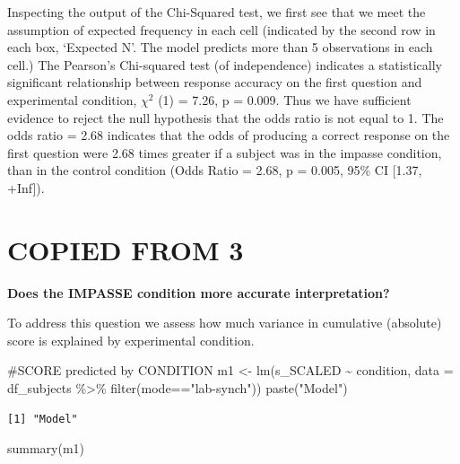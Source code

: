 \documentclass[
  letterpaper,
  DIV=11,
  numbers=noendperiod]{scrreprt}
\newenvironment{Shaded}{\begin{snugshade}}{\end{snugshade}}
\newcommand{\AttributeTok}[1]{\textcolor[rgb]{0.40,0.45,0.13}{#1}}
\newcommand{\CommentTok}[1]{\textcolor[rgb]{0.37,0.37,0.37}{#1}}
\newcommand{\FunctionTok}[1]{\textcolor[rgb]{0.28,0.35,0.67}{#1}}
\newcommand{\NormalTok}[1]{\textcolor[rgb]{0.00,0.23,0.31}{#1}}
\newcommand{\OtherTok}[1]{\textcolor[rgb]{0.00,0.23,0.31}{#1}}
\newcommand{\SpecialCharTok}[1]{\textcolor[rgb]{0.37,0.37,0.37}{#1}}
\newcommand{\StringTok}[1]{\textcolor[rgb]{0.13,0.47,0.30}{#1}}
\begin{document}
Inspecting the output of the Chi-Squared test, we first see that we meet
the assumption of expected frequency in each cell (indicated by the
second row in each box, `Expected N'. The model predicts more than 5
observations in each cell.) The Pearson's Chi-squared test (of
independence) indicates a statistically significant relationship between
response accuracy on the first question and experimental condition,
\(\chi^2\) (1) = 7.26, p = 0.009. Thus we have sufficient evidence to
reject the null hypothesis that the odds ratio is not equal to 1. The
odds ratio = 2.68 indicates that the odds of producing a correct
response on the first question were 2.68 times greater if a subject was
in the impasse condition, than in the control condition (Odds Ratio =
2.68, p = 0.005, 95\% CI {[}1.37, +Inf{]}).

\hypertarget{copied-from-3}{%
\section{COPIED FROM 3}\label{copied-from-3}}

\textbf{Does the IMPASSE condition more accurate interpretation?}

To address this question we assess how much variance in cumulative
(absolute) score is explained by experimental condition.

\begin{Shaded}
\begin{Highlighting}[]
\CommentTok{\#SCORE predicted by CONDITION}
\NormalTok{m1 }\OtherTok{\textless{}{-}} \FunctionTok{lm}\NormalTok{(s\_SCALED }\SpecialCharTok{\textasciitilde{}}\NormalTok{ condition, }\AttributeTok{data =}\NormalTok{ df\_subjects }\SpecialCharTok{\%\textgreater{}\%} \FunctionTok{filter}\NormalTok{(mode}\SpecialCharTok{==}\StringTok{"lab{-}synch"}\NormalTok{))}
\FunctionTok{paste}\NormalTok{(}\StringTok{"Model"}\NormalTok{)}
\end{Highlighting}
\end{Shaded}

\begin{verbatim}
[1] "Model"
\end{verbatim}

\begin{Shaded}
\begin{Highlighting}[]
\FunctionTok{summary}\NormalTok{(m1)}
\end{Highlighting}
\end{Shaded}
\end{document}
